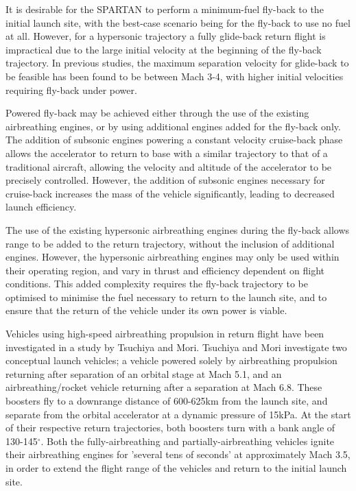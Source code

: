 \documentclass[conf]{new-aiaa}
\begin{document}
It is desirable for the SPARTAN to perform a minimum-fuel fly-back to the initial launch site, with the best-case scenario being for the fly-back to use no fuel at all. However, for a hypersonic trajectory a fully glide-back return flight is impractical due to the large initial velocity at the beginning of the fly-back trajectory. 
In previous studies, the maximum separation velocity for glide-back to be feasible has been found to be between Mach 3-4, with higher initial velocities requiring fly-back under power.

Powered fly-back may be achieved either through the use of the existing airbreathing engines, or by using additional engines added for the fly-back only. 
The addition of subsonic engines powering a constant velocity cruise-back phase allows the accelerator to return to base with a similar trajectory to that of a traditional aircraft, allowing the velocity and altitude of the accelerator to be precisely controlled. However, the addition of subsonic engines necessary for cruise-back increases the mass of the vehicle significantly, leading to decreased launch efficiency. 

The use of the existing hypersonic airbreathing engines during the fly-back allows range to be added to the return trajectory, without the inclusion of additional engines. However, the hypersonic airbreathing engines may only be used within their operating region, and vary in thrust and efficiency dependent on flight conditions. This added complexity requires the fly-back trajectory to be optimised to minimise the fuel necessary to return to the launch site, and to ensure that the return of the vehicle under its own power is viable. 


Vehicles using high-speed airbreathing propulsion in return flight have been investigated in a study by Tsuchiya and Mori.  Tsuchiya and Mori investigate two conceptual launch vehicles; a vehicle powered solely by airbreathing propulsion returning after separation of an orbital stage at Mach 5.1, and an airbreathing/rocket vehicle returning after a separation at Mach 6.8. 
These boosters fly to a downrange distance of 600-625km from the launch site, and separate from the orbital accelerator at a dynamic pressure of 15kPa. At the start of their respective return trajectories, both boosters turn with a bank angle of 130-145$^\circ$. Both the fully-airbreathing and partially-airbreathing vehicles ignite their airbreathing engines for 'several tens of seconds' at approximately Mach 3.5, in order to extend the flight range of the vehicles and return to the initial launch site.
\end{document}
